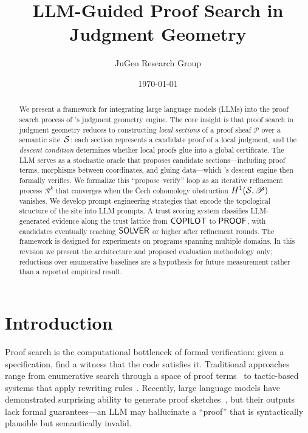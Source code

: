 \documentclass[11pt]{article}
\title{\textbf{LLM-Guided Proof Search in Judgment Geometry}}
\author{%
  JuGeo Research Group
}
\date{\today}
\newcommand{\RefineOp}{\mathcal{R}}
\newcommand{\ProofSheaf}{\mathscr{P}}
\begin{document}
\maketitle

\begin{abstract}
We present a framework for integrating large language models (LLMs) into
the proof search process of \JuGeo's judgment geometry engine.  The core
insight is that proof search in judgment geometry reduces to constructing
\emph{local sections} of a proof sheaf $\ProofSheaf$ over a semantic
site~$\mathcal{S}$: each section represents a candidate proof of a local
judgment, and the \emph{descent condition} determines whether local
proofs glue into a global certificate.  The LLM serves as a stochastic
oracle that proposes candidate sections---including proof terms,
morphisms between coordinates, and gluing data---which \JuGeo's descent
engine then formally verifies.  We formalize this ``propose--verify''
loop as an iterative refinement process $\RefineOp^k$ that converges
when the \v{C}ech cohomology obstruction $\Hcoh{1}(\Site, \ProofSheaf)$
vanishes.  We develop prompt engineering strategies that encode the
topological structure of the site into LLM prompts.  A trust scoring
system classifies LLM-generated evidence along the trust lattice from
$\mathsf{COPILOT}$ to $\mathsf{PROOF}$, with candidates eventually reaching $\mathsf{SOLVER}$
or higher after refinement rounds.  The framework is designed for
experiments on programs spanning multiple domains. In this revision we present
the architecture and proposed evaluation methodology only; reductions over
enumerative baselines are a hypothesis for future measurement rather than a
reported empirical result.
\end{abstract}

\newpage

\section{Introduction}\label{sec:intro}

Proof search is the computational bottleneck of formal verification:
given a specification, find a witness that the code satisfies it.
Traditional approaches range from enumerative search through a space
of proof terms~\cite{Czajka2018} to tactic-based systems that apply
rewriting rules~\cite{deMoura2021}.  Recently, large language models
have demonstrated surprising ability to generate proof
sketches~\cite{First2023,Jiang2022}, but their outputs lack formal
guarantees---an LLM may hallucinate a ``proof'' that is syntactically
plausible but semantically invalid.
\end{document}
